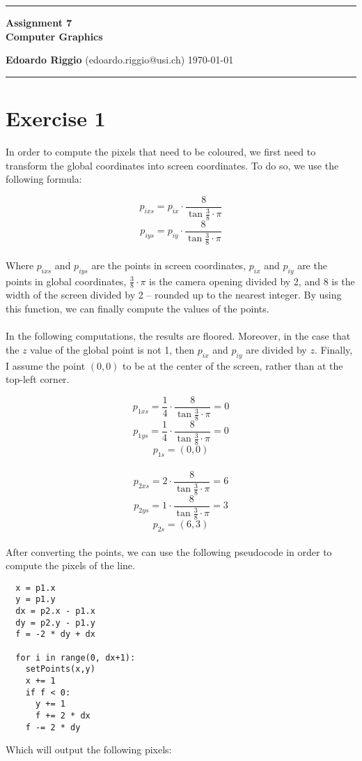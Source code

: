 \documentclass{article}
\begin{document}
\begin{center}
\hrule

\vspace{.4cm}
{\bf {\Huge Assignment 7}} \\
\vspace{.2cm}
{\bf Computer Graphics}
\vspace{.2cm}
\end{center}{\bf Edoardo Riggio } (edoardo.riggio@usi.ch) \hspace{\fill}  \today \\
\hrule
\vspace{.2cm}

\section{Exercise 1}
In order to compute the pixels that need to be coloured, we first need to transform the global coordinates into screen coordinates. To do so, we use the following formula:

\[ p_{ixs} = p_{ix} \cdot \frac{8}{\tan{\frac{3}{8}} \cdot \pi} \]
\[ p_{iys} = p_{iy} \cdot \frac{8}{\tan{\frac{3}{8}} \cdot \pi} \] \\
Where $p_{ixs}$ and $p_{iys}$ are the points in screen coordinates, $p_{ix}$ and $p_{iy}$ are the points in global coordinates, ${\frac{3}{8}\cdot \pi}$ is the camera opening divided by 2, and 8 is the width of the screen divided by 2 -- rounded up to the nearest integer. By using this function, we can finally compute the values of the points.\\ \\
In the following computations, the results are floored. Moreover, in the case that the $z$ value of the global point is not 1, then $p_{ix}$ and $p_{iy}$ are divided by $z$. Finally, I assume the point $(0,0)$ to be at the center of the screen, rather than at the top-left corner.

\[ p_{1xs} = \frac{1}{4} \cdot \frac{8}{\tan{\frac{3}{8}} \cdot \pi} = 0 \]
\[ p_{1ys} = \frac{1}{4} \cdot \frac{8}{\tan{\frac{3}{8}} \cdot \pi} = 0 \]
\[ p_{1s} = (0,0) \] \\
\[ p_{2xs} = 2 \cdot \frac{8}{\tan{\frac{3}{8}} \cdot \pi} = 6 \]
\[ p_{2ys} = 1 \cdot \frac{8}{\tan{\frac{3}{8}} \cdot \pi} = 3 \]
\[ p_{2s} = (6,3) \] \\
After converting the points, we can use the following pseudocode in order to compute the pixels of the line.

\begin{verbatim}
  x = p1.x
  y = p1.y
  dx = p2.x - p1.x
  dy = p2.y - p1.y
  f = -2 * dy + dx

  for i in range(0, dx+1):
    setPoints(x,y)
    x += 1
    if f < 0:
      y += 1
      f += 2 * dx
    f -= 2 * dy
\end{verbatim}
Which will output the following pixels:
\end{document}
